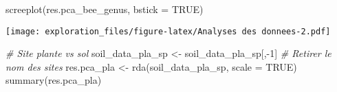 \documentclass[
]{article}
\newenvironment{Shaded}{\begin{snugshade}}{\end{snugshade}}
\newcommand{\AttributeTok}[1]{\textcolor[rgb]{0.77,0.63,0.00}{#1}}
\newcommand{\CommentTok}[1]{\textcolor[rgb]{0.56,0.35,0.01}{\textit{#1}}}
\newcommand{\ConstantTok}[1]{\textcolor[rgb]{0.00,0.00,0.00}{#1}}
\newcommand{\DecValTok}[1]{\textcolor[rgb]{0.00,0.00,0.81}{#1}}
\newcommand{\FunctionTok}[1]{\textcolor[rgb]{0.00,0.00,0.00}{#1}}
\newcommand{\NormalTok}[1]{#1}
\newcommand{\OtherTok}[1]{\textcolor[rgb]{0.56,0.35,0.01}{#1}}
\newcommand{\SpecialCharTok}[1]{\textcolor[rgb]{0.00,0.00,0.00}{#1}}
\begin{document}
\begin{Shaded}
\begin{Highlighting}[]
\FunctionTok{screeplot}\NormalTok{(res.pca\_bee\_genus, }\AttributeTok{bstick =} \ConstantTok{TRUE}\NormalTok{)}
\end{Highlighting}
\end{Shaded}

\texttt{[image: exploration\_files/figure-latex/Analyses des donnees-2.pdf]}

\begin{Shaded}
\begin{Highlighting}[]
\CommentTok{\# Site plante vs sol}
\NormalTok{soil\_data\_pla\_sp }\OtherTok{\textless{}{-}}\NormalTok{ soil\_data\_pla\_sp[,}\SpecialCharTok{{-}}\DecValTok{1}\NormalTok{] }\CommentTok{\# Retirer le nom des sites}
\NormalTok{res.pca\_pla }\OtherTok{\textless{}{-}} \FunctionTok{rda}\NormalTok{(soil\_data\_pla\_sp, }\AttributeTok{scale =} \ConstantTok{TRUE}\NormalTok{)}
\FunctionTok{summary}\NormalTok{(res.pca\_pla)}
\end{Highlighting}
\end{Shaded}
\end{document}
